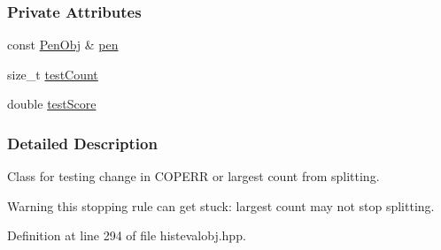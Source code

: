 \subsubsection*{\-Private \-Attributes}
\begin{DoxyCompactItemize}
\item 
const \hyperlink{classsubpavings_1_1PenObj}{\-Pen\-Obj} \& \hyperlink{classsubpavings_1_1CritCOPERRChangeOrLargestCount__LTE_a1aa6dd39f856481128f0f854d755fc10}{pen}
\item 
size\-\_\-t \hyperlink{classsubpavings_1_1CritCOPERRChangeOrLargestCount__LTE_a225e0e6f64b91c57530a1e5157d21be8}{test\-Count}
\item 
double \hyperlink{classsubpavings_1_1CritCOPERRChangeOrLargestCount__LTE_acd8afac0f7fca3d0b95f245e0baeab8e}{test\-Score}
\end{DoxyCompactItemize}


\subsubsection{\-Detailed \-Description}
\-Class for testing change in \-C\-O\-P\-E\-R\-R or largest count from splitting. 

\begin{DoxyWarning}{\-Warning}
this stopping rule can get stuck\-: largest count may not stop splitting. 
\end{DoxyWarning}


\-Definition at line 294 of file histevalobj.\-hpp.



